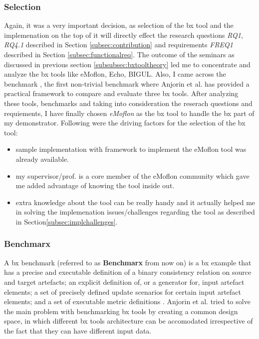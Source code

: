 \subsubsection{Selection}\label{subsubsec:bxtoolselection}
Again, it was a very important decision, as selection of the bx tool and the implemenation on the top of it will directly effect the research questions \textit{RQ1}, \textit{RQ4.1} described in Section \ref{subsec:contribution} and requirements \textit{FREQ1} described in Section \ref{subsec:functionalreq}.
\newline\newline The outcome of the seminars as discussed in previous section \ref{subsubsec:bxtooltheory} led me to concentrate and analyze the bx tools like eMoflon, Echo, BIGUL. Also, I came across the benchmark \cite{benchmarx} \cite{benchmarx-reload}, the first non-trivial benchmark where Anjorin et al. has provided a practical framework to compare and evaluate three bx tools. After analyzing these tools, benchmarks and taking into consideration the reserach questions and requiements, I have finally chosen \textit{eMoflon} as the bx tool to handle the bx part of my demonstrator. Following were the driving factors for the selection of the bx tool:
\begin{itemize}
	\item {sample implementation with framework to implement the eMoflon tool was already available.}
	\item {my supervisor/prof. is a core member of the eMoflon community which gave me added advantage of knowing the tool inside out.}
	\item {extra knowledge about the tool can be really handy and it actually helped me in solving the implemenation issues/challenges regarding the tool as described in Section\ref{subsec:implchallenges}.}
\end{itemize}

\subsubsection{Benchmarx}\label{subsubsec:benchmarx}
A bx benchmark (referred to as \textbf{Benchmarx} from now on) is a bx example that has a precise and executable definition of a binary consistency relation on source and target artefacts; an explicit definition of, or a generator for, input artefact elements; a set of precisely defined update scenarios for certain input artefact elements; and a set of executable metric definitions \cite{bx-theoryandappl}.
\newline\newline Anjorin et al. \cite{benchmarx-reload} tried to solve the main problem with benchmarking bx tools by creating a common design space, in which different bx tools architecture can be accomodated irrespective of the fact that they can have different input data. 

